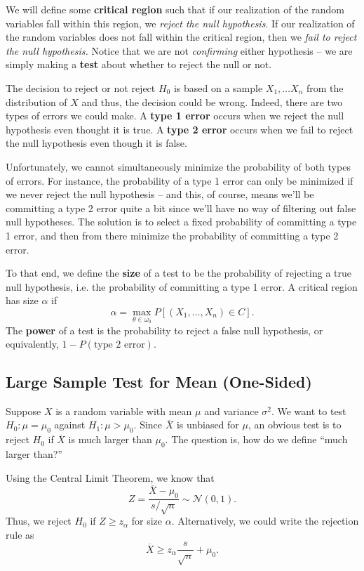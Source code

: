 \documentclass[12pt]{article}
\newcommand{\xbar}{\overline{X}}
\newcommand{\normal}[2]{\mathcal{N} \left({#1}, {#2} \right)}
\theoremstyle{definition}
\begin{document}
We will define some \textbf{critical region} such that if our realization of the random variables fall within this region, we \emph{reject the null hypothesis}. If our realization of the random variables does not fall within the critical region, then we \emph{fail to reject the null hypothesis.} Notice that we are not \emph{confirming} either hypothesis -- we are simply making a \textbf{test} about whether to reject the null or not.

 The decision to reject or not reject $H_0$ is based on a sample $X_1, \hdots X_n$ from the distribution of $X$ and thus, the decision could be wrong. Indeed, there are two types of errors we could make. A \textbf{type 1 error} occurs when we reject the null hypothesis even thought it is true. A \textbf{type 2 error} occurs when we fail to reject the null hypothesis even though it is false.
 
 Unfortunately, we cannot simultaneously minimize the probability of both types of errors. For instance, the probability of a type 1 error can only be minimized if we never reject the null hypothesis -- and this, of course, means we'll be committing a type 2 error quite a bit since we'll have no way of filtering out false null hypotheses. The solution is to select a fixed probability of committing a type 1 error, and then from there minimize the probability of committing a type 2 error. 
 
To that end, we define the \textbf{size} of a test to be the probability of rejecting a true null hypothesis, i.e. the probability of committing a type 1 error. A critical region has size $\alpha$ if 	
	\[	\alpha = \max_{\theta \in \omega_0} P[(X_1, \hdots, X_n) \in C].	\]
	The \textbf{power} of a test is the probability to reject a false null hypothesis, or equivalently, $1 - P(\text{type 2 error})$. 
	
	
\subsection{Large Sample Test for Mean (One-Sided)}

Suppose $X$ is a random variable with mean $\mu$ and variance $\sigma^2$. We want to test $H_0: \mu = \mu_0$ against $H_1: \mu > \mu_0$. Since $\xbar$ is unbiased for $\mu$, an obvious test is to reject $H_0$ if $\xbar$ is much larger than $\mu_0$. The question is, how do we define ``much larger than?'' 

Using the Central Limit Theorem, we know that 
	\[Z = \frac{\xbar - \mu_0}{s/\sqrt{n}} \sim \normal{0}{1}.	\]
Thus, we reject $H_0$ if $Z \geq z_{\alpha}$ for size $\alpha$. Alternatively, we could write the rejection rule as
\begin{equation} \label{rejectexample}
	\xbar   \geq z_{\alpha}\frac{s}{\sqrt{n}}+\mu_0.
\end{equation}
\end{document}
